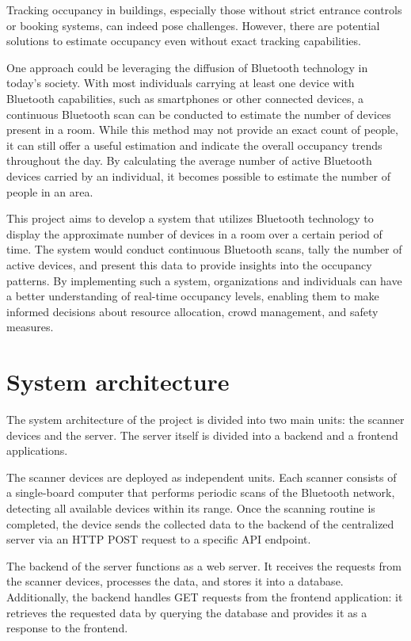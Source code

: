 \documentclass[a4paper, 11pt]{article}
\begin{document}
Tracking occupancy in buildings, especially those without strict entrance controls or booking systems, can indeed pose challenges. However, there are potential solutions to estimate occupancy even without exact tracking capabilities.

One approach could be leveraging the diffusion of Bluetooth technology in today's society. With most individuals carrying at least one device with Bluetooth capabilities, such as smartphones or other connected devices, a continuous Bluetooth scan can be conducted to estimate the number of devices present in a room. While this method may not provide an exact count of people, it can still offer a useful estimation and indicate the overall occupancy trends throughout the day. By calculating the average number of active Bluetooth devices carried by an individual, it becomes possible to estimate the number of people in an area. 

This project aims to develop a system that utilizes Bluetooth technology to display the approximate number of devices in a room over a certain period of time. The system would conduct continuous Bluetooth scans, tally the number of active devices, and present this data to provide insights into the occupancy patterns. By implementing such a system, organizations and individuals can have a better understanding of real-time occupancy levels, enabling them to make informed decisions about resource allocation, crowd management, and safety measures.

\newpage
\section{System architecture}
The system architecture of the project is divided into two main units: the scanner devices and the server. The server itself is divided into a backend and a frontend applications.

The scanner devices are deployed as independent units. Each scanner consists of a single-board computer that performs periodic scans of the Bluetooth network, detecting all available devices within its range. Once the scanning routine is completed, the device sends the collected data to the backend of the centralized server via an HTTP POST request to a specific API endpoint.

The backend of the server functions as a web server. It receives the requests from the scanner devices, processes the data, and stores it into a database. Additionally, the backend handles GET requests from the frontend application: it retrieves the requested data by querying the database and provides it as a response to the frontend.
\end{document}
